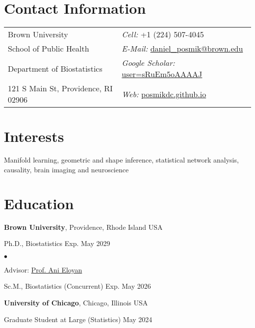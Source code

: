 \documentclass[margin,line]{res}
\newenvironment{list1}{
  \begin{list}{\ding{113}}{%
      \setlength{\itemsep}{0in}
      \setlength{\parsep}{0in} \setlength{\parskip}{0in}
      \setlength{\topsep}{0in} \setlength{\partopsep}{0in} 
      \setlength{\leftmargin}{0.17in}}}{\end{list}}
\newenvironment{list2}{
  \begin{list}{$\bullet$}{%
      \setlength{\itemsep}{0in}
      \setlength{\parsep}{0in} \setlength{\parskip}{0in}
      \setlength{\topsep}{0in} \setlength{\partopsep}{0in} 
      \setlength{\leftmargin}{0.2in}}}{\end{list}}
\begin{document}

\begin{resume}
\section{\sc Contact Information}
\vspace{.05in}
\begin{tabular}{@{}p{3in}p{4in}}
Brown University & {\it Cell:} +1 (224) 507-4045 \\ 
School of Public Health & {\it E-Mail:} \href{mailto:daniel_posmik@brown.edu}{daniel\_posmik@brown.edu} \\ 
Department of Biostatistics & {\it Google Scholar:} \href{https://scholar.google.com/citations?user=sRuEm5oAAAAJ}{user=sRuEm5oAAAAJ} \\
121 S Main St, Providence, RI 02906 & {\it Web:} \href{https://posmikdc.github.io}{posmikdc.github.io} \\       
\end{tabular}

\section{\sc Interests}
Manifold learning, geometric and shape inference, statistical network analysis, causality, brain imaging and neuroscience

\section{\sc Education}
{\bf Brown University}, Providence, Rhode Island USA\\
\vspace*{-.15in}
\begin{list1}
  \item[] Ph.D., Biostatistics \hfill Exp. May 2029

\begin{list2}
\vspace*{.05in}
\item Advisor: \href{http://www.anieloyan.com}{Prof. Ani Eloyan}
\end{list2}
\vspace*{.03in}
\item[] Sc.M., Biostatistics (Concurrent) \hfill Exp. May 2026
\end{list1}

{\bf University of Chicago}, Chicago, Illinois USA\\
\vspace*{-.15in}
\begin{list1}
\item[] Graduate Student at Large (Statistics) \hfill May 2024
\end{list1}


\end{resume}
\end{document}
